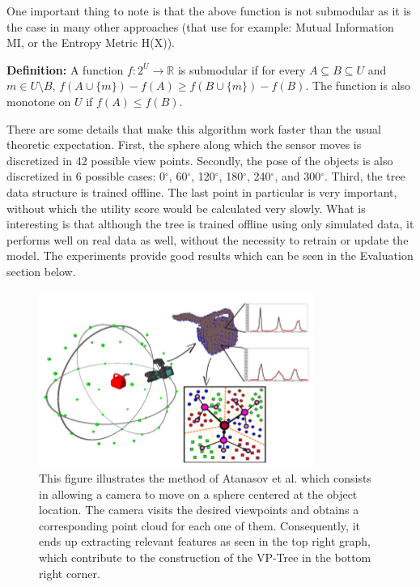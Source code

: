 \documentclass[12pt,twoside]{article}
\theoremstyle{plain}
\theoremstyle{definition}
\theoremstyle{remark}
\begin{document}
One important thing to note is that the above function is not submodular as it is the case in many other approaches (that use for example: Mutual Information MI, or the Entropy Metric H(X)).

\textbf{Definition:}
A function $f:2^U \rightarrow \mathbb{R}$  is submodular if for every $A\subseteq B \subseteq U$ and $m \in U \setminus B$, $f(A \cup\{m\})-f(A)\geqslant f(B \cup\{m\})-f(B)$. The function is also monotone on $U$ if $f(A) \leqslant f(B)$.

There are some details that make this algorithm work faster than the usual theoretic expectation. First, the sphere along which the sensor moves is discretized in 42 possible view points. Secondly, the pose of the objects is also discretized in 6 possible cases: 0$^{\circ}$, 60$^{\circ}$, 120$^{\circ}$, 180$^{\circ}$, 240$^{\circ}$, and 300$^{\circ}$. Third, the tree data structure is trained offline. The last point in particular is very important, without which the utility score would be calculated very slowly. What is interesting is that although the tree is trained offline using only simulated data, it performs well on real data as well, without the necessity to retrain or update the model. The experiments provide good results which can be seen in the Evaluation section below.

\begin{figure}[H]

  
  \centering
    \includegraphics[scale=0.7]{atanasovmethod1.png}
    \caption{
  This figure illustrates the method of Atanasov et al. \cite{atanasov2014nonmyopic} which consists in allowing a camera to move on a sphere centered at the object location. The camera visits the desired viewpoints and obtains a corresponding point cloud for each one of them. Consequently, it ends up extracting relevant features as seen in the top right graph, which contribute to the construction of the VP-Tree in the bottom right corner. }
  
  \label{atanasovmethod1}
\end{figure}
\end{document}

